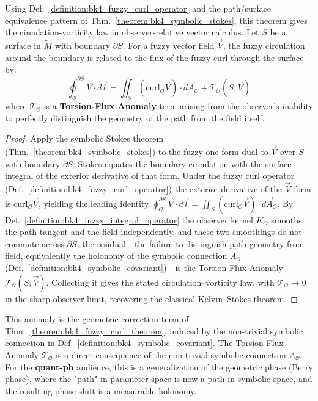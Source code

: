 \begin{theorem}
\label{theorem:bk4_fuzzy_curl_theorem}
Using Def.~\ref{definition:bk4_fuzzy_curl_operator} and the path/surface equivalence pattern of Thm.~\ref{theorem:bk4_symbolic_stokes}, this theorem gives the circulation-vorticity law in observer-relative vector calculus.
Let $S$ be a surface in $\tilde{M}$ with boundary $\partial S$. For a fuzzy vector field $\vec{V}$, the fuzzy circulation around the boundary is related to the flux of the fuzzy curl through the surface by:
\[
\oint_{\mathcal{O}}^{\partial S} \vec{V} \cdot d\vec{l} = \iint_{S} (\text{curl}_{\mathcal{O}} \vec{V}) \cdot d\vec{A}_{\mathcal{O}} + \mathcal{T}_{\mathcal{O}}(S, \vec{V})
\]
where $\mathcal{T}_{\mathcal{O}}$ is a \textbf{Torsion-Flux Anomaly} term arising from the observer's inability to perfectly distinguish the geometry of the path from the field itself.
\end{theorem}

\begin{proof}
\label{proof:bk4_fuzzy_curl_theorem}
\leavevmode
Apply the symbolic Stokes theorem (Thm.~\ref{theorem:bk4_symbolic_stokes}) to the fuzzy one-form dual to $\vec{V}$ over $S$ with boundary $\partial S$: Stokes equates the boundary circulation with the surface integral of the exterior derivative of that form. Under the fuzzy curl operator (Def.~\ref{definition:bk4_fuzzy_curl_operator}) the exterior derivative of the $\vec{V}$-form is $\mathrm{curl}_{\mathcal{O}}\vec{V}$, yielding the leading identity $\oint_{\mathcal{O}}^{\partial S}\vec{V}\cdot d\vec{l} = \iint_{S}(\mathrm{curl}_{\mathcal{O}}\vec{V})\cdot d\vec{A}_{\mathcal{O}}$. By Def.~\ref{definition:bk4_fuzzy_integral_operator} the observer kernel $K_O$ smooths the path tangent and the field independently, and these two smoothings do not commute across $\partial S$; the residual---the failure to distinguish path geometry from field, equivalently the holonomy of the symbolic connection $A_{\mathcal{O}}$ (Def.~\ref{definition:bk4_symbolic_covariant})---is the Torsion-Flux Anomaly $\mathcal{T}_{\mathcal{O}}(S,\vec{V})$. Collecting it gives the stated circulation--vorticity law, with $\mathcal{T}_{\mathcal{O}} \to 0$ in the sharp-observer limit, recovering the classical Kelvin--Stokes theorem.
\end{proof}

\begin{scholium}
\label{scholium:bk4_torsion_flux_anomaly}
This anomaly is the geometric correction term of Thm.~\ref{theorem:bk4_fuzzy_curl_theorem}, induced by the non-trivial symbolic connection in Def.~\ref{definition:bk4_symbolic_covariant}.
The Torsion-Flux Anomaly $\mathcal{T}_{\mathcal{O}}$ is a direct consequence of the non-trivial symbolic connection $A_{\mathcal{O}}$. For the \textbf{quant-ph} audience, this is a generalization of the geometric phase (Berry phase), where the "path" in parameter space is now a path in symbolic space, and the resulting phase shift is a measurable holonomy.
\end{scholium}

